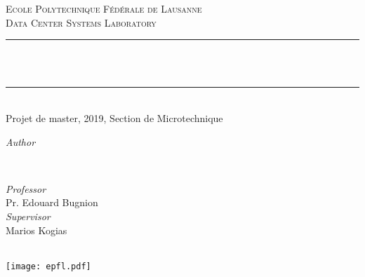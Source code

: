 \makeatletter
{}
\begin{titlepage}
	\newcommand{\HRule}{\rule{\linewidth}{0.5mm}}

	\center


	\textsc{\LARGE Ecole Polytechnique Fédérale de Lausanne}\\[1cm]

	\textsc{\Large Data Center Systems Laboratory}\\[0.5cm]


	\HRule\\[0.4cm]

	{\huge\bfseries \@title}\\[0.4cm]

    \HRule\\[0.4cm]
    {\large{}Projet de master, 2019, Section de Microtechnique}\\[1.5cm]


    \begin{minipage}[t]{0.4\textwidth}
		\begin{flushleft}
			\large
			\textit{Author}\\
			\@author
		\end{flushleft}
	\end{minipage}
	~
    \begin{minipage}[t]{0.4\textwidth}
		\begin{flushright}
			\large
			\textit{Professor}\\
            Pr. Edouard Bugnion\\
			\textit{Supervisor}\\
			Marios Kogias
		\end{flushright}
	\end{minipage}

    \vfill

    {\large\@date}\\

	\texttt{[image: epfl.pdf]}
\end{titlepage}
\restoregeometry

